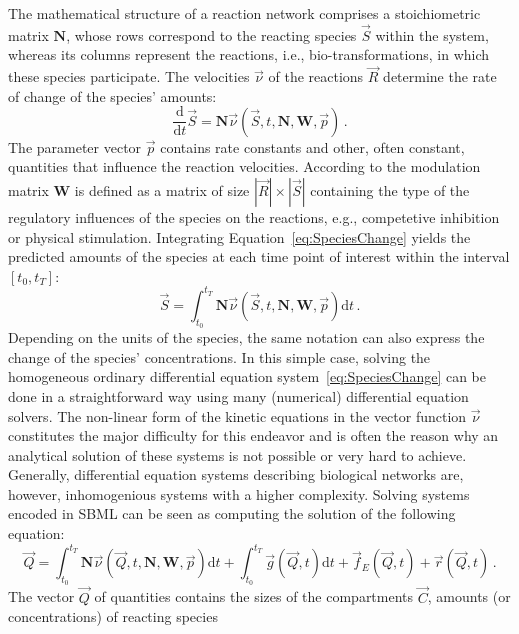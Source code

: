 \documentclass[10pt]{bmc_article}
\newenvironment{bmcformat}{\baselineskip20pt\sloppy\setboolean{publ}{false}}{\baselineskip20pt\sloppy}
\newcommand{\D}{\mathrm{d}}
\begin{document}
\begin{bmcformat}
The mathematical structure of a reaction network comprises a stoichiometric
matrix $\mathbf{N}$, whose rows correspond to the reacting species $\vec{S}$
within the system, whereas its columns represent the reactions, i.e., bio-transformations,
in which these species participate.
The velocities $\vec{\nu}$ of the reactions $\vec{R}$ determine the rate of
change of the species' amounts:
\begin{equation}
\frac{\D}{\D t}\vec{S} = \mathbf{N}\vec{\nu}(\vec{S}, t, \mathbf{N}, \mathbf{W}, \vec{p})\,.
\label{eq:SpeciesChange}
\end{equation}
The parameter vector $\vec{p}$ contains rate constants and other, often
constant, quantities that influence the reaction velocities.
According to \cite{Liebermeister2006, Liebermeister2010} the modulation matrix
$\mathbf{W}$ is defined as a matrix of size $|\vec{R}|\times|\vec{S}|$
containing the type of the regulatory influences of the species on
the reactions, e.g., competetive inhibition or physical stimulation.
Integrating Equation~\ref{eq:SpeciesChange} yields the predicted amounts of the
species at each time point of interest within the interval $[t_0, t_T]$:
\begin{equation}
\vec{S} = \int_{t_0}^{t_T} \mathbf{N}\vec{\nu}(\vec{S}, t, \mathbf{N}, \mathbf{W}, \vec{p})
\D t\,.
\end{equation}
Depending on the units of the species, the same notation can also express the
change of the species' concentrations.
In this simple case, solving the homogeneous ordinary
differential equation system~\ref{eq:SpeciesChange} can be done in a
straightforward way using many (numerical) differential equation solvers.
The non-linear form of the kinetic equations in the vector function $\vec{\nu}$
constitutes the major difficulty for this endeavor and is often the reason why
an analytical solution of these systems is not possible or very hard to achieve.
Generally, differential equation systems describing biological networks are,
however, inhomogenious systems with a higher complexity.
Solving systems encoded in SBML can be seen as computing the solution of the following
equation:
\begin{equation}
\vec{Q} = \int_{t_0}^{t_T} \mathbf{N}\vec{\nu}(\vec{Q}, t, \mathbf{N}, \mathbf{W},
\vec{p})\D t + \int_{t_0}^{t_T} \vec{g}(\vec{Q}, t)\D t + \vec{f}_E(\vec{Q}, t) +
\vec{r}(\vec{Q}, t)\,.
\label{eq:QuantityValue}
\end{equation}
The vector $\vec{Q}$ of quantities contains the sizes of the
compartments $\vec{C}$, amounts (or concentrations) of reacting species

\end{bmcformat}
\end{document}
